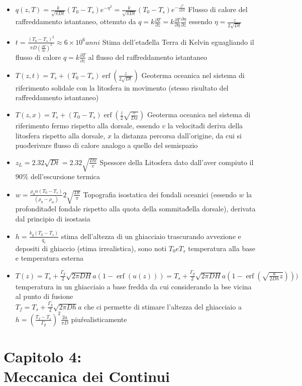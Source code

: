 \documentclass[a4paper]{article}
\DeclareMathOperator \erf{erf} %
\begin{document}
\begin{itemize}
	\item $q(z,T) = \frac{k}{\sqrt{\pi Dt}} (T_0-T_s) e^{-\eta^2} = \frac{k}{\sqrt{\pi Dt}} (T_0-T_s) e^{-\frac{z^2}{4Dt}}$ Flusso di calore del raffreddamento istantaneo, ottenuto da $q=k \frac{\partial T}{\partial z}= k\frac{\partial T}{\partial \eta} \frac{\partial \eta}{\partial z}$ essendo $\eta = \frac{z}{2 \sqrt{Dt}}$
	\item $t= \frac{(T_0-T_s)^2}{\pi D (\frac{\partial T}{\partial z})^2} \approx 6 \times 10^6 anni$ Stima dell'eta\' della Terra di Kelvin eguagliando il flusso di calore $q=k\frac{\partial T}{\partial z}$ al flusso del raffreddamento istantaneo
	\item $T(z,t) = T_s + (T_0 - T_s) \erf(\frac{z}{2 \sqrt{Dt}})$ Geoterma oceanica nel sistema di riferimento solidale con la litosfera in movimento (stesso risultato del raffreddamento istantaneo)
	\item $T(z,x) = T_s + (T_0 - T_s) \erf(\frac{z}{2} \sqrt{\frac{v}{Dx}})$ Geoterma oceanica nel sistema di riferimento fermo rispetto alla dorsale, essendo $v$ la velocita\' di deriva della litosfera rispetto alla dorsale, $x$ la distanza percorsa dall'origine, da cui si puo\' derivare flusso di calore analogo a quello del semispazio
	\item $z_L=2.32 \sqrt{Dt}=2.32 \sqrt{\frac{Dx}{v}}$ Spessore della Litosfera dato dall'aver compiuto il 90\% dell'escursione termica
	\item $ w = \frac{\rho_0 \alpha (T_0-T_s)}{(\rho_0-\rho_w)} 2 \sqrt{\frac{Dt}{\pi}}  $ Topografia isostatica dei fondali oceanici (essendo $w$ la profondita\' del fondale rispetto alla quota della sommita\' della dorsale), derivata dal principio di isostasia
	\item $h=\frac{k_g(T_0-T_s)}{q_c}$ stima dell'altezza di un ghiacciaio trascurando avvezione e depositi di ghiaccio (stima irrealistica), sono noti $T_0 e T_s$ temperatura alla base e temperatura esterna
	\item $T(z)=T_s+\frac{\Gamma_g}{2} \sqrt{2 \pi D H}{a}(1-\erf(u(z))) =T_s+\frac{\Gamma_g}{2} \sqrt{2 \pi D H}{a}(1-\erf(\sqrt{\frac{a}{2Dh}z})))$ temperatura in un ghiacciaio a base fredda da cui considerando la bse vicina al punto di fusione\\ $T_f=T_s+\frac{\Gamma_g}{2}\sqrt{2 \pi D h}{a}$ che ci permette di stimare l'altezza del ghiacciaio a $h=(\frac{T_f-T_s}{\Gamma_g})^2\frac{2a}{\pi D}$ piu\' realisticamente
\end{itemize}

\section{Capitolo 4:\\ Meccanica dei Continui}
\end{document}
